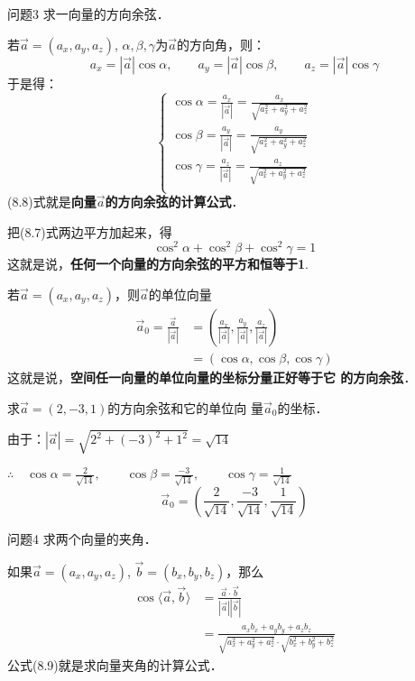\begin{blk}
    {问题3} 求一向量的方向余弦．
\end{blk}

若$\vec{a}=(a_x,a_y,a_z)$, $\alpha,\beta,\gamma$为$\vec{a}$的方向角，则：
\[a_x=|\vec{a}|\cos\alpha,\qquad a_y=|\vec{a}|\cos\beta,\qquad a_z=|\vec{a}|\cos\gamma\]
于是得：
\begin{equation}
    \begin{cases}
    \cos\alpha=\frac{a_x}{|\vec{a}|}=\frac{a_x}{\sqrt{a^2_x+a^2_y+a^2_z}}\\
    \cos\beta=\frac{a_y}{|\vec{a}|}=\frac{a_y}{\sqrt{a^2_x+a^2_y+a^2_z}}\\
    \cos\gamma=\frac{a_z}{|\vec{a}|}=\frac{a_z}{\sqrt{a^2_x+a^2_y+a^2_z}}\\        
    \end{cases}
\end{equation}
(8.8)式就是\textbf{向量$\vec{a}$的方向余弦的计算公式}．

把(8.7)式两边平方加起来，得
\[\cos^2\alpha+\cos^2\beta+\cos^2\gamma=1\]
这就是说，\textbf{任何一个向量的方向余弦的平方和恒等于1}.

若$\vec{a}=(a_x,a_y,a_z)$，则$\vec{a}$的单位向量
\[\begin{split}
    \vec{a}_0=\frac{\vec{a}}{|\vec{a}|}&=\left(\frac{a_x}{|\vec{a}|},\frac{a_y}{|\vec{a}|},\frac{a_z}{|\vec{a}|}\right)\\
    &=(\cos\alpha,\cos\beta,\cos\gamma)
\end{split}\]
这就是说，\textbf{空间任一向量的单位向量的坐标分量正好等于它
的方向余弦}．

\begin{example}
    求$\vec{a}=(2,-3,1)$的方向余弦和它的单位向
量$\vec{a}_0$的坐标．
\end{example}

\begin{solution}
由于：$|\vec{a}|=\sqrt{2^2+(-3)^2+1^2}=\sqrt{14}$

$\therefore\quad \cos\alpha=\frac{2}{\sqrt{14}},\qquad \cos\beta=\frac{-3}{\sqrt{14}},\qquad \cos\gamma=\frac{1}{\sqrt{14}}$
\[\vec{a}_0=\left(\frac{2}{\sqrt{14}},\frac{-3}{\sqrt{14}},\frac{1}{\sqrt{14}}\right)\]
\end{solution}

\begin{blk}
    {问题4}
求两个向量的夹角．
\end{blk}

如果$\vec{a}=(a_x,a_y,a_z)$, $\vec{b}=(b_x,b_y,b_z)$，那么
\begin{equation}
    \begin{split}
\cos\langle \vec{a},\vec{b}\rangle &=\frac{\vec{a}\cdot \vec{b}}{|\vec{a}||\vec{b}|}\\
&=\frac{a_xb_x+a_yb_y+a_zb_z}{\sqrt{a^2_x+a^2_y+a^2_z}\cdot \sqrt{b^2_x+b^2_y+b^2_z}}
    \end{split}
\end{equation}
公式(8.9)就是求向量夹角的计算公式．



